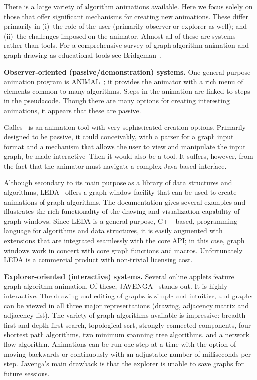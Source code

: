 There is a large variety of algorithm animations available. Here we focus solely on those that offer significant mechanisms for creating new animations.
These differ primarily in (i)~the role of the user (primarily observer
or explorer as well); and
(ii)~the challenges imposed on the animator.
Almost all of these are systems rather than tools.
For a comprehensive survey of graph algorithm animation and graph drawing
as educational tools see Bridgeman~\cite{2013-GDBook-Bridgeman}. 

\textbf{Observer-oriented (passive/demonstration) systems.}
One general purpose animation program is ANIMAL~\cite{2002-JVLC-Roessling,ANIMAL};
it provides the animator
with a rich menu
of elements common to many algorithms.
Steps in the animation are linked to steps in the pseudocode.
Though there are many options for creating interesting animations,
it appears that these are passive.

Galles~\cite{Galles} is an animation tool with very
sophisticated creation options.
Primarily designed to be passive, it could conceivably, with a parser
for a graph input format and a mechanism that allows the user to view and
manipulate the input graph, be made interactive.
Then it would also be a tool.
It suffers, however, from the fact that the
animator must navigate a complex Java-based interface.

Although secondary to its main purpose as a library of data structures and
algorithms,
LEDA~\cite{1999-LEDA-Mehlhorn} offers a graph window facility that can be
used to create animations of graph algorithms.
The documentation gives several examples and illustrates the rich functionality of
the drawing and visualization capability of graph windows.
Since LEDA is a general purpose, C++-based, programming language for
algorithms and data structures, it is easily augmented with extensions that
are integrated seamlessly with the core API; in this case, graph windows work
in concert with core graph functions and macros.
Unfortunately LEDA is a commercial product with
non-trivial licensing cost.

\textbf{Explorer-oriented (interactive) systems.}
Several online applets feature graph algorithm animation. Of these,
JAVENGA~\cite{JAVENGA} stands out. It is highly interactive. The drawing and
editing of
graphs is simple and intuitive, and graphs can be viewed in all three major
representations (drawing, adjacency matrix and adjacency list).
The variety of graph algorithms available is impressive:
breadth-first and depth-first search, topological sort, strongly connected
components, four shortest path algorithms, two minimum spanning tree
algorithms, and a network flow algorithm.
Animations can be run one step at a time with the option of moving backwards
or continuously with an adjustable number of milliseconds per step.
Javenga's main drawback is that the explorer is unable to save graphs for
future sessions.

